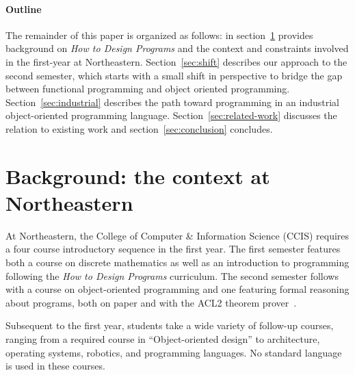 \documentclass[submission,copyright]{eptcs}
\begin{document}
\paragraph{Outline} The remainder of this paper is organized as follows:
in section~\ref{sec:background} provides background on \emph{How to
  Design Programs} and the context and constraints involved in the
first-year at Northeastern.  Section~\ref{sec:shift} describes our
approach to the second semester, which starts with a small shift in
perspective to bridge the gap between functional programming and
object oriented programming.  Section~\ref{sec:industrial} describes
the path toward programming in an industrial object-oriented
programming language.  Section~\ref{sec:related-work} discusses the
relation to existing work and section~\ref{sec:conclusion} concludes.




\section{Background: the context at Northeastern}
\label{sec:background}

At Northeastern, the College of Computer \& Information Science (CCIS)
requires a four course introductory sequence in the first year.  The
first semester features both a course on discrete mathematics as well
as an introduction to programming following the \emph{How to Design
  Programs} curriculum.  The second semester follows with a course on
object-oriented programming and one featuring formal reasoning about
programs, both on paper and with the ACL2 theorem
prover~\cite{dvanhorn:Kaufmann2000ComputerAided}.

Subsequent to the first year, students take a wide variety of
follow-up courses, ranging from a required course in ``Object-oriented
design'' to architecture, operating systems, robotics, and programming
languages.  No standard language is used in these courses.  
\end{document}
